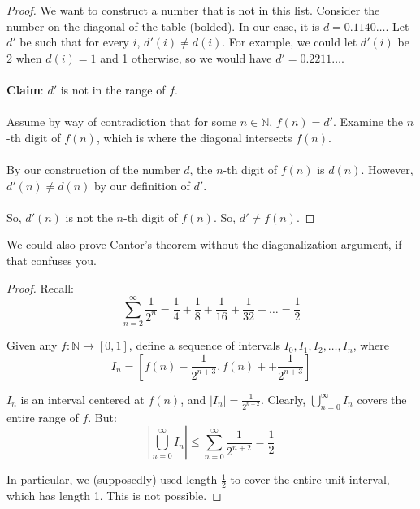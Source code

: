 \documentclass[]{article}
\theoremstyle{definition}
\begin{document}
\begin{proof}
        We want to construct a number that is not in this list. Consider the number on the diagonal of the table (bolded). In our case, it is $d = 0.1140\ldots$. Let $d'$ be such that for every $i$, $d'(i) \not = d(i)$. For example, we could let $d'(i)$ be 2 when $d(i) = 1$ and 1 otherwise, so we would have $d' = 0.2211\ldots$.
        \\ \\
        \textbf{Claim}: $d'$ is not in the range of $f$.
        \\ \\
        Assume by way of contradiction that for some $n \in \mathbb{N}$, $f(n) = d'$. Examine the $n$-th digit of $f(n)$, which is where the diagonal intersects $f(n)$.
        \\ \\
        By our construction of the number $d$, the $n$-th digit of $f(n)$ is $d(n)$. However, $d'(n) \not = d(n)$ by our definition of $d'$.
        \\ \\
        So, $d'(n)$ is not the $n$-th digit of $f(n)$. So, $d' \not = f(n)$.
      \end{proof}

      We could also prove Cantor's theorem without the diagonalization argument, if that confuses you.
      \begin{proof}
        Recall:
        $$
          \sum_{n = 2}^{\infty} \frac{1}{2^n} = \frac{1}{4} + \frac{1}{8} + \frac{1}{16} + \frac{1}{32} + \ldots = \frac{1}{2}
        $$

        Given any $f: \mathbb{N} \to [0, 1]$, define a sequence of intervals $I_0, I_1, I_2, \ldots, I_n$, where
        $$
          I_n = \left[f(n) - \frac{1}{2^{n + 3}}, f(n) + + \frac{1}{2^{n + 3}}\right]
        $$

        $I_n$ is an interval centered at $f(n)$, and $|I_n| = \frac{1}{2^{n + 2}}$. Clearly, $\displaystyle \bigcup_{n = 0}^{\infty} I_n$ covers the entire range of $f$. But:
        $$
          \left|\bigcup_{n = 0}^{\infty} I_n\right| \le \sum_{n = 0}^{\infty} \frac{1}{2^{n + 2}} = \frac{1}{2}
        $$

        In particular, we (supposedly) used length $\frac{1}{2}$ to cover the entire unit interval, which has length 1. This is not possible.
      \end{proof}
\end{document}

